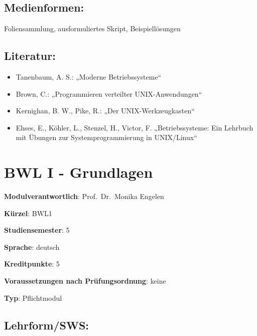 \section*{Medienformen:}\label{medienformen-3}

Foliensammlung, ausformuliertes Skript, Beispiellösungen

\section*{Literatur:}\label{literatur-3}

\begin{itemize}
\tightlist
\item
  Tanenbaum, A. S.: „Moderne Betriebssysteme``
\item
  Brown, C.: „Programmieren verteilter UNIX-Anwendungen``
\item
  Kernighan, B. W., Pike, R.: „Der UNIX-Werkzeugkasten``
\item
  Ehses, E., Köhler, L., Stenzel, H., Victor, F. „Betriebssysteme: Ein
  Lehrbuch mit Übungen zur Systemprogrammierung in UNIX/Linux``
\end{itemize}

\chapter{BWL I - Grundlagen}\label{bwl-i---grundlagen}

\begin{modulHead}
\textbf{Modulverantwortlich}: Prof.~Dr.~Monika
Engelen
\end{modulHead}
\begin{modulHead}
\textbf{Kürzel}:
BWL1
\end{modulHead}
\begin{modulHead}
\textbf{Studiensemester}:
5
\end{modulHead}
\begin{modulHead}
\textbf{Sprache}:
deutsch
\end{modulHead}
\begin{modulHead}
\textbf{Kreditpunkte}:
5
\end{modulHead}
\begin{modulHead}
\textbf{Voraussetzungen nach
Prüfungsordnung}: keine
\end{modulHead}
\begin{modulHead}
\textbf{Typ}:
Pflichtmodul
\end{modulHead}


\section*{Lehrform/SWS:}\label{lehrformsws-6}

